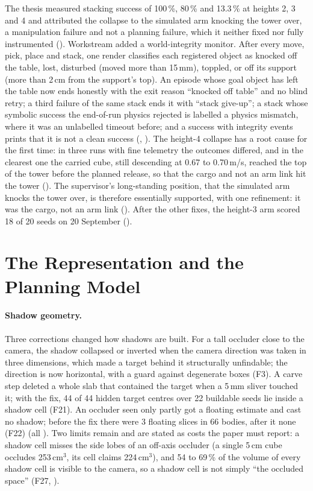 The thesis measured stacking success of 100\,\%, 80\,\% and 13.3\,\% at heights
2, 3 and 4 and attributed the collapse to the simulated arm knocking the tower
over, a manipulation failure and not a planning failure, which it neither fixed
nor fully instrumented (). Workstream  added a world-integrity monitor.
After every move, pick, place and stack, one render classifies each registered
object as knocked off the table, lost, disturbed (moved more than 15\,mm),
toppled, or off its support (more than 2\,cm from the support's top). An episode
whose goal object has left the table now ends honestly with the exit reason
``knocked off table'' and no blind retry; a third failure of the same stack ends
it with ``stack give-up''; a stack whose symbolic success the end-of-run physics
rejected is labelled a physics mismatch, where it was an unlabelled timeout before;
and a success with integrity events prints that it is not a clean success
(, ). The height-4 collapse has a root cause for the first time: in
three runs with fine telemetry the outcomes differed, and in the clearest one the
carried cube, still descending at 0.67 to 0.70\,m/s, reached the top of the tower
before the planned release, so that the cargo and not an arm link hit the tower
(). The supervisor's long-standing position, that the simulated arm knocks the
tower over, is therefore essentially supported, with one refinement: it was the
cargo, not an arm link (). After the other fixes, the height-3 arm scored 18 of
20 seeds on 20 September ().

\section{The Representation and the Planning Model}
\label{sec:model}

\paragraph{Shadow geometry.} Three corrections changed how shadows are built. For
a tall occluder close to the camera, the shadow collapsed or inverted when the
camera direction was taken in three dimensions, which made a target behind it
structurally unfindable; the direction is now horizontal, with a guard against
degenerate boxes (F3). A carve step deleted a whole slab that contained the
target when a 5\,mm sliver touched it; with the fix, 44 of 44 hidden target
centres over 22 buildable seeds lie inside a shadow cell (F21). An occluder seen
only partly got a floating estimate and cast no shadow; before the fix there were
3 floating slices in 66 bodies, after it none (F22) (all ). Two limits remain
and are stated as costs the paper must report: a shadow cell misses the side lobes
of an off-axis occluder (a single 5\,cm cube occludes 253\,cm$^3$, its cell
claims 224\,cm$^3$), and 54 to 69\,\% of the volume of every shadow cell is
visible to the camera, so a shadow cell is not simply ``the occluded space'' (F27,
).

